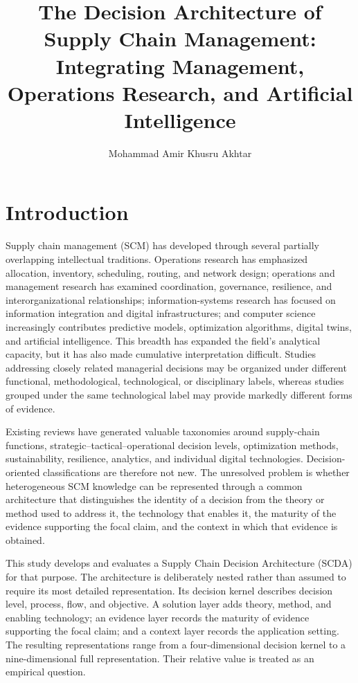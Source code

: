 \documentclass[journal]{IEEEtran}
\title{The Decision Architecture of Supply Chain Management: Integrating Management, Operations Research, and Artificial Intelligence}
\author{Mohammad Amir Khusru Akhtar}
\begin{document}
\maketitle


\section{Introduction}
Supply chain management (SCM) has developed through several partially overlapping intellectual traditions. Operations research has emphasized allocation, inventory, scheduling, routing, and network design; operations and management research has examined coordination, governance, resilience, and interorganizational relationships; information-systems research has focused on information integration and digital infrastructures; and computer science increasingly contributes predictive models, optimization algorithms, digital twins, and artificial intelligence. This breadth has expanded the field's analytical capacity, but it has also made cumulative interpretation difficult. Studies addressing closely related managerial decisions may be organized under different functional, methodological, technological, or disciplinary labels, whereas studies grouped under the same technological label may provide markedly different forms of evidence.

Existing reviews have generated valuable taxonomies around supply-chain functions, strategic--tactical--operational decision levels, optimization methods, sustainability, resilience, analytics, and individual digital technologies. Decision-oriented classifications are therefore not new. The unresolved problem is whether heterogeneous SCM knowledge can be represented through a common architecture that distinguishes the identity of a decision from the theory or method used to address it, the technology that enables it, the maturity of the evidence supporting the focal claim, and the context in which that evidence is obtained.

This study develops and evaluates a Supply Chain Decision Architecture (SCDA) for that purpose. The architecture is deliberately nested rather than assumed to require its most detailed representation. Its decision kernel describes decision level, process, flow, and objective. A solution layer adds theory, method, and enabling technology; an evidence layer records the maturity of evidence supporting the focal claim; and a context layer records the application setting. The resulting representations range from a four-dimensional decision kernel to a nine-dimensional full representation. Their relative value is treated as an empirical question.
\end{document}
